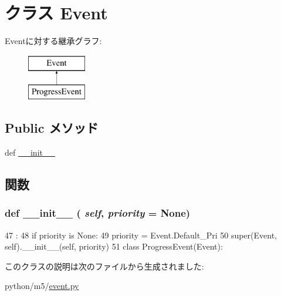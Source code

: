 \hypertarget{classm5_1_1event_1_1Event}{
\section{クラス Event}
\label{classm5_1_1event_1_1Event}
}
Eventに対する継承グラフ:\begin{figure}[H]
\begin{center}
\leavevmode
\includegraphics[height=2cm]{classm5_1_1event_1_1Event}
\end{center}
\end{figure}
\subsection*{Public メソッド}
\begin{DoxyCompactItemize}
\item 
def \hyperlink{classm5_1_1event_1_1Event_ac775ee34451fdfa742b318538164070e}{\_\-\_\-init\_\-\_\-}
\end{DoxyCompactItemize}


\subsection{関数}
\hypertarget{classm5_1_1event_1_1Event_ac775ee34451fdfa742b318538164070e}{
\subsubsection[{\_\-\_\-init\_\-\_\-}]{\setlength{\rightskip}{0pt plus 5cm}def \_\-\_\-init\_\-\_\- ( {\em self}, \/   {\em priority} = {\ttfamily None})}}
\label{classm5_1_1event_1_1Event_ac775ee34451fdfa742b318538164070e}



\begin{DoxyCode}
47                                      :
48         if priority is None:
49             priority = Event.Default_Pri
50         super(Event, self).__init__(self, priority)
51 
class ProgressEvent(Event):
\end{DoxyCode}


このクラスの説明は次のファイルから生成されました:\begin{DoxyCompactItemize}
\item 
python/m5/\hyperlink{event_8py}{event.py}\end{DoxyCompactItemize}
